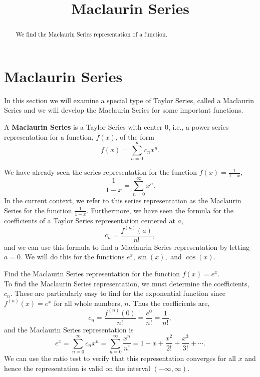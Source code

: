 \documentclass{ximera}
\title{Maclaurin Series}
\begin{document}
\begin{abstract}
We find the Maclaurin Series representation of a function.
\end{abstract}

\maketitle

\section{Maclaurin Series}


In this section we will examine a special type of Taylor Series, called a Maclaurin Series and we will develop the Maclaurin Series for 
some important functions.

\begin{definition} 
A \textbf{Maclaurin Series} is a Taylor Series with center 0, i.e., a power series representation 
for a function, $f(x)$, of the form
\[
f(x) = \sum_{n=0}^\infty c_n x^n.
\]
\end{definition}
 
We have already seen the series representation for the function $f(x) = \frac{1}{1-x}$,
\[
\frac{1}{1-x} = \sum_{n=0}^\infty  x^n.
\]
In the current context, we refer to this series representation as the Maclaurin Series for the function $\frac{1}{1-x}$.
Furthermore, we have seen the formula for the coefficients of a Taylor Series representation centered at $a$,
\[
c_n = \frac{f^{(n)}(a)}{n!},
\]
and we can use this formula to find a Maclaurin Series representation by letting $a = 0$.
We will do this for the functions $e^x, \sin(x),$ and $\cos(x)$.

\begin{example} 
Find the Maclaurin Series representation for the function $f(x) = e^x$.\\
To find the Maclaurin Series representation, we must determine the coefficients, $c_n$. These are particularly easy to find for the exponential function
since $f^{(n)}(x) = e^x$ for all whole numbers, $n$. Thus the coefficients are,
\[
c_n = \frac{f^{(n)}(0)}{n!} = \frac{e^0}{n!} = \frac{1}{n!},
\]
and the Maclaurin Series representation is 
\[
e^x = \sum_{n=0}^\infty c_n x^n = \sum_{n=0}^\infty \frac{x^n}{n!} = 1 + x + \frac{x^2}{2!} + \frac{x^3}{3!} + \cdots.
\]
We can use the ratio test to verify that this representation converges for all $x$ and 
hence the representation is valid on the interval $(-\infty, \infty)$.
\end{example}
\end{document}
